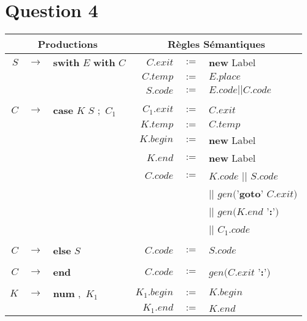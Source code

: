 \documentclass[class=article]{standalone}
\begin{document}
\section*{Question 4}
\begin{center}
  \begin{tabular}{|rcl|rcl|}
      \hline
      \multicolumn{3}{|c}{\bf Productions} &
      \multicolumn{3}{|c|}{\bf Règles Sémantiques} \\
      \hline
      \hline
      $S$ & $\rightarrow$ & {\bf swith} $E$ {\bf with} $C$ & $C.exit$  & $:=$ & {\bf new} Label\\
          &               &                                & $C.temp$  & $:=$ & $E.place$\\
          &               &                                & $S.code$  & $:=$ & $E.code || C.code$\\
      &&&&&\\
      $C$ & $\rightarrow$ & {\bf case} $K$ $S$ $;$ $C_1$ & $C_1.exit$ & $:=$ & $C.exit$\\
          &               &                              & $K.temp$   & $:=$ & $C.temp$\\
          &               &                              & $K.begin$  & $:=$ & {\bf new} Label\\
          &               &                              & $K.end$    & $:=$ & {\bf new} Label\\
          &               &                              & $C.code$   & $:=$ & $K.code$ || $S.code$\\
          &               &                              &            &      & || $gen($'{\bf goto}' $C.exit) $\\
          &               &                              &            &      & || $gen(K.end $ '{\bf :}'$)$ \\
          &               &                              &            &      & || $C_1.code $  \\
      &&&&&\\
      $C$ & $\rightarrow$ & {\bf else} $S$ & $C.code$ & $:=$ & $S.code$ \\
      &&&&&\\
      $C$ & $\rightarrow$ & {\bf end} & $C.code$ & $:=$ & $gen(C.exit$ '{\bf :}'$)$ \\
      &&&&&\\
      $K$ & $\rightarrow$ & {\bf num} $,$ $K_1$ & $K_1.begin$ & $:=$ & $K.begin$ \\
          &               &                     & $K_1.end$   & $:=$ & $K.end$\\

\end{tabular}
\end{center}
\end{document}
